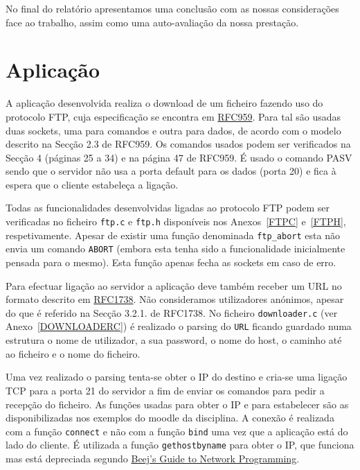 \documentclass[11pt,a4paper,reqno]{report}
\numberwithin{equation}{section}
\begin{document}
No final do relatório apresentamos uma conclusão com as nossas considerações face ao trabalho, assim como uma auto-avaliação da nossa prestação.


\chapter{Aplicação}

A aplicação desenvolvida realiza o download de um ficheiro fazendo uso do protocolo FTP, cuja especificação se encontra em  \href{https://www.ietf.org/rfc/rfc959.txt}{RFC959}.
Para tal são usadas duas sockets, uma para comandos e outra para dados, de acordo com o modelo descrito na Secção 2.3 de RFC959.
Os comandos usados podem ser verificados na Secção 4 (páginas 25 a 34)  e na página 47 de RFC959. É usado o comando PASV sendo que o servidor não usa a porta default para os dados (porta 20) e fica à espera que o cliente estabeleça a ligação.

Todas as funcionalidades desenvolvidas ligadas ao protocolo FTP podem ser verificadas no ficheiro \verb|ftp.c| e \verb|ftp.h| disponíveis nos Anexos~\ref{FTPC} e~\ref{FTPH}, respetivamente. Apesar de existir uma função denominada \verb|ftp_abort| esta não envia um comando \verb|ABORT| (embora esta tenha sido a funcionalidade inicialmente pensada para o mesmo). Esta função apenas fecha as sockets em caso de erro.

Para efectuar ligação ao servidor a aplicação deve também receber um URL no formato descrito em \href{https://www.ietf.org/rfc/rfc1738.txt}{RFC1738}. Não consideramos utilizadores anónimos, apesar do que é referido na Secção 3.2.1. de RFC1738. No ficheiro \verb|downloader.c| (ver Anexo~\ref{DOWNLOADERC}) é realizado o parsing do \verb|URL| ficando guardado numa estrutura o nome de utilizador, a sua password, o nome do host, o caminho até ao ficheiro e o nome do ficheiro.

Uma vez realizado o parsing tenta-se obter o IP do destino e cria-se uma ligação TCP para a porta 21 do servidor a fim de enviar os comandos para pedir a recepção do ficheiro. As funções usadas para obter o IP e para estabelecer são as disponibilizadas nos exemplos do moodle da disciplina. A conexão é realizada com a função \verb|connect| e não com a função \verb|bind| uma vez que a aplicação está do lado do cliente. É utilizada a função \verb|gethostbyname| para obter o IP, que funciona mas está depreciada segundo \href{http://beej.us/guide/bgnet/output/html/multipage/index.html}{Beej's Guide to Network Programming}.
\end{document}
